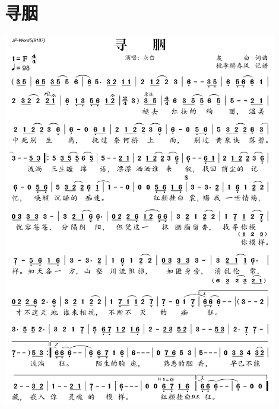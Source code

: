 \documentclass[cn,pad,twocol]{elegantbook}
\begin{document}
\section{寻胭}\includegraphics[width=0.9\textwidth]{rpi400/20210124-寻胭.png}
\end{document}
